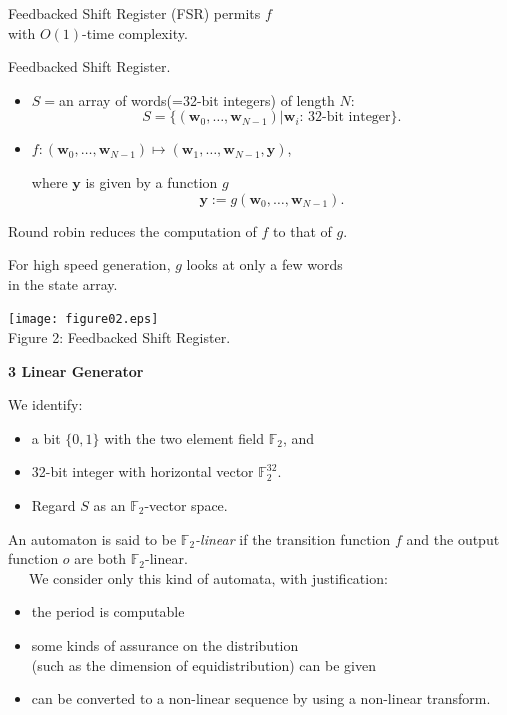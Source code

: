 \documentclass[a4j,12pt,landscape]{jarticle}
\def\F2{{\mathbb F}_2}
\def\by{{{\mathbf y}}}
\def\bw{{{\mathbf w}}}
\begin{document}
\vskip 5mm
Feedbacked Shift Register (FSR) permits $f$ \\
with $O(1)$-time complexity.

\newpage
Feedbacked Shift Register.
\begin{itemize}
\item
$S=$an array of words(=32-bit integers) of length $N$:
$$
S = \{(\bw_0,\ldots,\bw_{N-1})| \bw_i \mbox{: 32-bit integer}\}.
$$
\item
$f:(\bw_0,\ldots,\bw_{N-1}) \mapsto (\bw_1,\ldots,\bw_{N-1}, \by)$,

where $\by$ is given by a function $g$
$$\by:=g(\bw_0,\ldots,\bw_{N-1}).$$
\end{itemize}

Round robin reduces the computation of $f$ to that of $g$. 

For high speed generation, $g$ looks at only a few words \\
in the state array.
\newpage

\begin{center}
\texttt{[image: figure02.eps]}
\\
Figure 2: Feedbacked Shift Register.
\\
\end{center}
\newpage
\noindent
{\bf 3 Linear Generator}

We identify: 
\begin{itemize}
\item 
a bit $\{0,1\}$ with the two element field $\F2$, and
\item 
32-bit integer with horizontal vector $\F2^{32}$.
\item 
Regard $S$ as an $\F2$-vector space.
\end{itemize}
An automaton is said to be {\em $\F2$-linear} if 
the transition function $f$ and 
the output function $o$ are both $\F2$-linear. \\
~~~We consider only this kind of automata, with 
justification:
\begin{itemize}
\item the period is computable
\item some kinds of assurance on the distribution \\
(such as the dimension of equidistribution) can be given
\item can be converted to a non-linear sequence 
by using a non-linear transform. 
\end{itemize}
\end{document}
